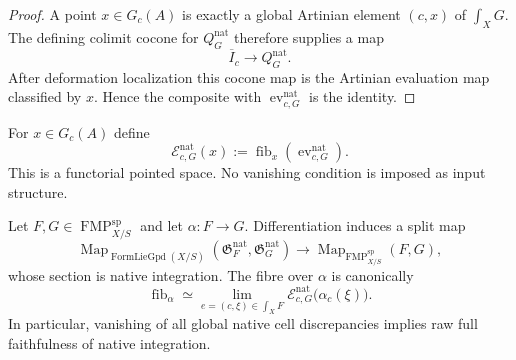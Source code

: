 \begin{proof}
A point $x\in G_c(A)$ is exactly a global Artinian element $(c,x)$ of
$\int_XG$.  The defining colimit cocone for $Q_G^{\mathrm{nat}}$ therefore
supplies a map
\[
    \overline I_c\longrightarrow Q_G^{\mathrm{nat}}.
\]
After deformation localization this cocone map is the Artinian evaluation map
classified by $x$.  Hence the composite with
$\operatorname{ev}^{\mathrm{nat}}_{c,G}$ is the identity.
\end{proof}

\begin{definition}
\label{def:bnli-native-cell-discrepancy}
For $x\in G_c(A)$ define
\[
\boxed{
    \mathscr E^{\mathrm{nat}}_{c,G}(x)
    :=
    \operatorname{fib}_{x}
    \left(
      \operatorname{ev}^{\mathrm{nat}}_{c,G}
    \right).}
\]
This is a functorial pointed space.  No vanishing condition is imposed as
input structure.
\end{definition}

\begin{theorem}
\label{thm:bnli-mapping-discrepancy}
Let $F,G\in\operatorname{FMP}^{\mathrm{sp}}_{X/S}$ and let
$\alpha:F\to G$.  Differentiation induces a split map
\[
\boxed{
    \operatorname{Map}_{\operatorname{FormLieGpd}(X/S)}
    (\mathfrak G_F^{\mathrm{nat}},\mathfrak G_G^{\mathrm{nat}})
    \longrightarrow
    \operatorname{Map}_{\operatorname{FMP}^{\mathrm{sp}}_{X/S}}(F,G),}
\]
whose section is native integration.  The fibre over $\alpha$ is canonically
\[
\boxed{
    \operatorname{fib}_{\alpha}
    \simeq
    \operatorname*{lim}_{e=(c,\xi)\in\int_XF}
    \mathscr E^{\mathrm{nat}}_{c,G}
    \bigl(\alpha_c(\xi)\bigr).}
\]
In particular, vanishing of all global native cell discrepancies implies raw
full faithfulness of native integration.
\end{theorem}

